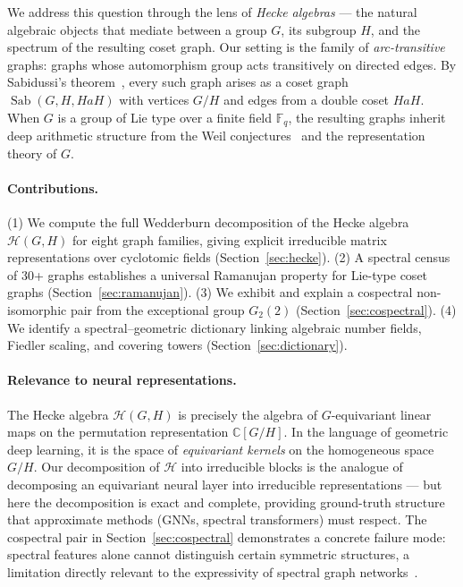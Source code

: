 \documentclass[mlmain]{jmlr}
\newcommand{\Sab}{\operatorname{Sab}}
\newcommand{\HH}{\mathcal{H}}
\newcommand{\F}{\mathbb{F}}
\newcommand{\CC}{\mathbb{C}}
\begin{document}
We address this question through the lens of \emph{Hecke algebras}
--- the natural algebraic objects that mediate between a group
$G$, its subgroup $H$, and the spectrum of the resulting
coset graph.  Our setting is the family of \emph{arc-transitive}
graphs: graphs whose automorphism group acts transitively on
directed edges.  By Sabidussi's theorem~\citep{sabidussi1964},
every such graph arises as a coset graph
$\Sab(G, H, HaH)$
with vertices $G/H$ and edges from a double coset $HaH$.
When $G$ is a group of Lie type over a finite field $\F_q$,
the resulting graphs inherit deep arithmetic structure from
the Weil conjectures~\citep{deligne1974} and the representation
theory of $G$.

\paragraph{Contributions.}
(1) We compute the full Wedderburn decomposition of the Hecke
algebra $\HH(G,H)$ for eight graph families, giving explicit
irreducible matrix representations over cyclotomic fields
(Section~\ref{sec:hecke}).
(2) A spectral census of 30+ graphs establishes a universal
Ramanujan property for Lie-type coset graphs
(Section~\ref{sec:ramanujan}).
(3) We exhibit and explain a cospectral non-isomorphic pair
from the exceptional group $G_2(2)$
(Section~\ref{sec:cospectral}).
(4) We identify a spectral--geometric dictionary linking
algebraic number fields, Fiedler scaling, and covering
towers (Section~\ref{sec:dictionary}).

\paragraph{Relevance to neural representations.}
The Hecke algebra $\HH(G,H)$ is precisely the algebra of
$G$-equivariant linear maps on the permutation representation
$\CC[G/H]$.  In the language of geometric deep learning, it is
the space of \emph{equivariant kernels} on the homogeneous space
$G/H$.  Our decomposition of $\HH$ into irreducible blocks
is the analogue of decomposing an equivariant neural layer into
irreducible representations --- but here the decomposition is
exact and complete, providing ground-truth structure that
approximate methods (GNNs, spectral transformers) must respect.
The cospectral pair in Section~\ref{sec:cospectral}
demonstrates a concrete failure mode: spectral features alone
cannot distinguish certain symmetric structures, a limitation
directly relevant to the expressivity of spectral graph
networks~\citep{xu2019, vandam2003}.
\end{document}
